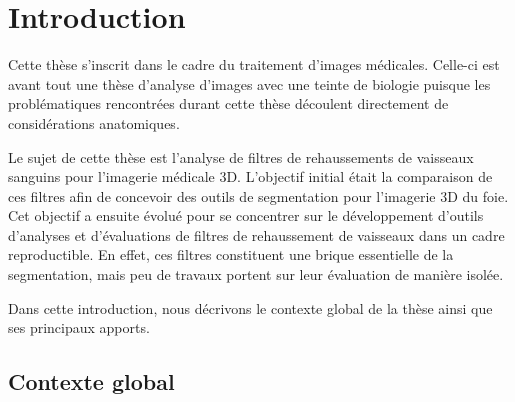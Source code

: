 %

\chapter{Introduction}
\label{sec:introduction}


Cette thèse s'inscrit dans le cadre du traitement d'images médicales. Celle-ci est avant tout une thèse d'analyse d'images avec une teinte de biologie puisque les problématiques rencontrées durant cette thèse découlent directement de considérations anatomiques.

Le sujet de cette thèse est l'analyse de filtres de rehaussements de vaisseaux sanguins pour l'imagerie médicale 3D. L'objectif initial était la comparaison de ces filtres afin de concevoir des outils de segmentation pour l'imagerie 3D du foie. Cet objectif a ensuite évolué pour se concentrer sur le développement d'outils d'analyses et d'évaluations de filtres de rehaussement de vaisseaux dans un cadre reproductible. En effet, ces filtres constituent une brique essentielle de la segmentation, mais peu de travaux portent sur leur évaluation de manière isolée.

Dans cette introduction, nous décrivons le contexte global de la thèse ainsi que ses principaux apports.

\section{Contexte global}

